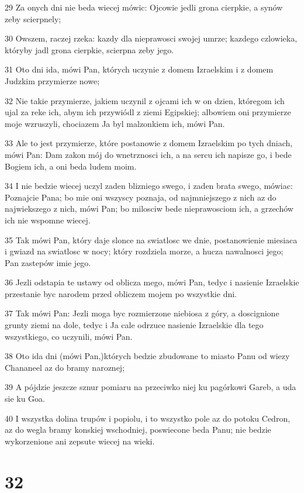 \par 29 Za onych dni nie beda wiecej mówic: Ojcowie jedli grona cierpkie, a synów zeby scierpnely;
\par 30 Owszem, raczej rzeka: kazdy dla nieprawosci swojej umrze; kazdego czlowieka, któryby jadl grona cierpkie, scierpna zeby jego.
\par 31 Oto dni ida, mówi Pan, których uczynie z domem Izraelskim i z domem Judzkim przymierze nowe;
\par 32 Nie takie przymierze, jakiem uczynil z ojcami ich w on dzien, któregom ich ujal za reke ich, abym ich przywiódl z ziemi Egipskiej; albowiem oni przymierze moje wzruszyli, chociazem Ja byl malzonkiem ich, mówi Pan.
\par 33 Ale to jest przymierze, które postanowie z domem Izraelskim po tych dniach, mówi Pan: Dam zakon mój do wnetrznosci ich, a na sercu ich napisze go, i bede Bogiem ich, a oni beda ludem moim.
\par 34 I nie bedzie wiecej uczyl zaden blizniego swego, i zaden brata swego, mówiac: Poznajcie Pana; bo mie oni wszyscy poznaja, od najmniejszego z nich az do najwiekszego z nich, mówi Pan; bo milosciw bede nieprawosciom ich, a grzechów ich nie wspomne wiecej.
\par 35 Tak mówi Pan, który daje slonce na swiatlosc we dnie, postanowienie miesiaca i gwiazd na swiatlosc w nocy; który rozdziela morze, a hucza nawalnosci jego; Pan zastepów imie jego.
\par 36 Jezli odstapia te ustawy od oblicza mego, mówi Pan, tedyc i nasienie Izraelskie przestanie byc narodem przed obliczem mojem po wszystkie dni.
\par 37 Tak mówi Pan: Jezli moga byc rozmierzone niebiosa z góry, a doscignione grunty ziemi na dole, tedyc i Ja cale odrzuce nasienie Izraelskie dla tego wszystkiego, co uczynili, mówi Pan.
\par 38 Oto ida dni (mówi Pan,)których bedzie zbudowane to miasto Panu od wiezy Chananeel az do bramy naroznej;
\par 39 A pójdzie jeszcze sznur pomiaru na przeciwko niej ku pagórkowi Gareb, a uda sie ku Goa.
\par 40 I wszystka dolina trupów i popiolu, i to wszystko pole az do potoku Cedron, az do wegla bramy konskiej wschodniej, poswiecone beda Panu; nie bedzie wykorzenione ani zepsute wiecej na wieki.

\chapter{32}

